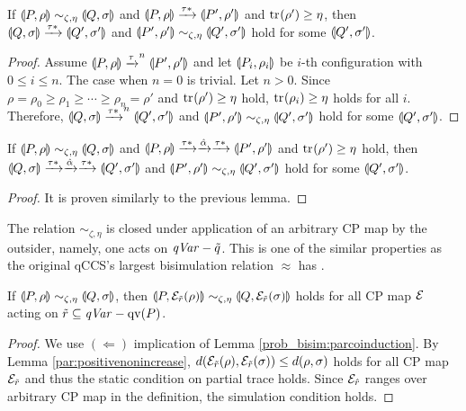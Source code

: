 \begin{lem}
 If $\llparenthesis P, \rho \rrparenthesis \sim_{\zeta, \eta} \llparenthesis Q, \sigma \rrparenthesis$ and 
$\llparenthesis P, \rho \rrparenthesis \xrightarrow{\tau\ast} \llparenthesis P', \rho' \rrparenthesis$ and
 ${\rm tr}_{}(\rho') \ge \eta$, then
$\llparenthesis Q, \sigma \rrparenthesis \xrightarrow{\tau\ast}
 \llparenthesis Q', \sigma' \rrparenthesis$ and $\llparenthesis P', \rho' \rrparenthesis \sim_{\zeta, \eta} \llparenthesis Q', \sigma' \rrparenthesis$ hold
 for some $\llparenthesis Q', \sigma' \rrparenthesis$.
\end{lem}
\begin{proof}
 Assume $\llparenthesis P, \rho \rrparenthesis \xrightarrow{\tau}^n \llparenthesis P', \rho' \rrparenthesis$
 and let $\llparenthesis P_i, \rho_i \rrparenthesis$ be $i$-th configuration with $0 \le i \le
 n$. The case when $n = 0$ is trivial. Let $n > 0$.
 Since $\rho = \rho_0 \ge \rho_1 \ge \cdots \ge \rho_n =
 \rho'$ and ${\rm tr}_{}(\rho') \ge \eta$ hold, 
 ${\rm tr}_{}(\rho_i) \ge \eta$ holds for all $i$. Therefore,
 $\llparenthesis Q, \sigma \rrparenthesis \xrightarrow{\tau\ast}^n
 \llparenthesis Q', \sigma' \rrparenthesis$ and $\llparenthesis P', \rho' \rrparenthesis \sim_{\zeta, \eta} \llparenthesis Q', \sigma' \rrparenthesis$ hold
 for some $\llparenthesis Q', \sigma' \rrparenthesis$.
\end{proof}

\begin{lem}
\label{par:weaksimulated}
 If $\llparenthesis P, \rho \rrparenthesis \sim_{\zeta, \eta} \llparenthesis Q, \sigma \rrparenthesis$
 and $\llparenthesis P, \rho \rrparenthesis \xrightarrow{\tau*} \xrightarrow{\hat \alpha} \xrightarrow{\tau*} \llparenthesis P', \rho' \rrparenthesis$ and
 ${\rm tr}_{}(\rho') \ge \eta$ hold, then 
 $\llparenthesis Q, \sigma \rrparenthesis \xrightarrow{\tau*} \xrightarrow{\hat \alpha} \xrightarrow{\tau*} \llparenthesis Q', \sigma' \rrparenthesis$ and
 $\llparenthesis P', \rho' \rrparenthesis \sim_{\zeta, \eta} \llparenthesis Q', \sigma' \rrparenthesis$ hold for some
 $\llparenthesis Q', \sigma' \rrparenthesis$.
\end{lem}
\begin{proof}
 It is proven similarly to the previous lemma.
\end{proof}

The relation $\sim_{\zeta, \eta}$ is closed under application
of an arbitrary CP map by the outsider,
namely, one acts on $\mathit{qVar} - \tilde q$.
This is one of the 
similar properties as the original qCCS's largest 
bisimulation relation $\approx$ has \cite{DengFeng2012}.
\begin{lem}
\label{par:cpclosed}
 If $\llparenthesis P, \rho \rrparenthesis \sim_{\zeta, \eta} \llparenthesis Q, \sigma \rrparenthesis$,
 then $\llparenthesis P, \mathcal{E}_{\tilde r}(\rho) \rrparenthesis \sim_{\zeta, \eta}
 \llparenthesis Q, \mathcal{E}_{\tilde r}(\sigma) \rrparenthesis$ holds for all 
 CP map $\mathcal{E}$ acting on $\tilde r \subseteq \mathit{qVar} - \mathrm{qv}(P)$.
\end{lem}
\begin{proof}
 We use $(\Leftarrow)$ implication of Lemma
 \ref{prob_bisim:parcoinduction}.
 By Lemma \ref{par:positivenonincrease},
 $d(\mathcal{E}_{\tilde r}(\rho), \mathcal{E}_{\tilde
 r}(\sigma)) \leq d(\rho, \sigma)$ holds for all
 CP map $\mathcal{E}_{\tilde r}$ and thus the static condition on partial trace holds.
 Since $\mathcal{E}_{\hat r}$ ranges over arbitrary CP map in the definition,
 the simulation condition holds.
\end{proof}

